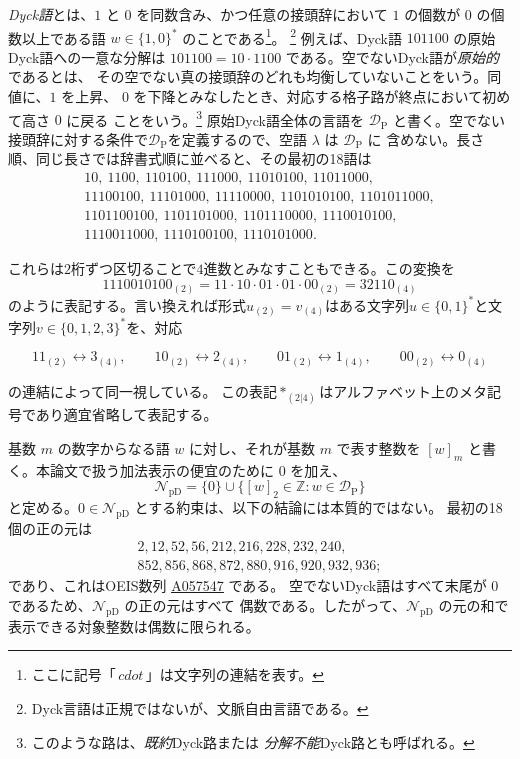 \documentclass[12pt]{ltjsarticle}
\theoremstyle{plain}
\theoremstyle{definition}
\theoremstyle{plain}
\newcommand{\val}[2]{[#1]_{#2}}
\newcommand{\NpD}{\mathcal{N}_{\mathrm{pD}}}
\newcommand{\DP}{\mathcal{D}_{\mathrm{P}}}
\newcommand{\seqnum}[1]{\href{https://oeis.org/#1}{\textrm{\underline{#1}}}}
\begin{document}
\emph{Dyck語}とは、$1$ と $0$ を同数含み、かつ任意の接頭辞において
$1$ の個数が $0$ の個数以上である語 $w\in\{1,0\}^*$ のことである\footnote{ここに記号「$\,cdot\,$」は文字列の連結を表す。}。
\footnote{Dyck言語は正規ではないが、文脈自由言語である。}
例えば、Dyck語 $101100$ の原始Dyck語への一意な分解は
$101100=10\cdot1100$ である。空でないDyck語が\emph{原始的}であるとは、
その空でない真の接頭辞のどれも均衡していないことをいう。同値に、$1$ を上昇、
$0$ を下降とみなしたとき、対応する格子路が終点において初めて高さ $0$ に戻る
ことをいう。\footnote{このような路は、\emph{既約}Dyck路または
\emph{分解不能}Dyck路とも呼ばれる。}
原始Dyck語全体の言語を $\DP$ と書く。空でない接頭辞に対する条件で$\DP$を定義するので、空語 $\lambda$ は $\DP$ に
含めない。長さ順、同じ長さでは辞書式順に並べると、その最初の18語は
\[
\begin{gathered}
10,\ 1100,\ 110100,\ 111000,\ 11010100,\ 11011000,\\
11100100,\ 11101000,\ 11110000,\ 1101010100,\ 1101011000,\\
1101100100,\ 1101101000,\ 1101110000,\ 1110010100,\\
1110011000,\ 1110100100,\ 1110101000.
\end{gathered}
\]

これらは$2$桁ずつ区切ることで$4$進数とみなすこともできる。この変換を
\[
11 10 01 01 00_{(2)}=11\cdot 10\cdot 01\cdot 01\cdot 00_{(2)}=32110_{(4)}
\]
のように表記する。言い換えれば形式$u_{(2)}=v_{(4)}$はある文字列$u\in\{0,1\}^*$と文字列$v\in\{0,1,2,3\}^*$を、対応


\[
 11_{(2)}\longleftrightarrow3_{(4)},\qquad
 10_{(2)}\longleftrightarrow2_{(4)},\qquad
 01_{(2)}\longleftrightarrow1_{(4)},\qquad
 00_{(2)}\longleftrightarrow0_{(4)}
\]

の連結によって同一視している。 この表記$*_{(2|4)}$はアルファベット上のメタ記号であり適宜省略して表記する。


基数 $m$ の数字からなる語 $w$ に対し、それが基数 $m$ で表す整数を
$\val{w}{m}$ と書く。本論文で扱う加法表示の便宜のために $0$ を加え、
\[
 \NpD=\{0\}\cup\{\val{w}{2}\in\mathbb{Z}:w\in\DP\}
\]
と定める。$0\in\NpD$ とする約束は、以下の結論には本質的ではない。
最初の18個の正の元は
\[
\begin{gathered}
2,12,52,56,212,216,228,232,240,\\
852,856,868,872,880,916,920,932,936;
\end{gathered}
\]
であり、これはOEIS数列 \seqnum{A057547} \cite{OEIS-A057547} である。
空でないDyck語はすべて末尾が $0$ であるため、$\NpD$ の正の元はすべて
偶数である。したがって、$\NpD$ の元の和で表示できる対象整数は偶数に限られる。
\end{document}
